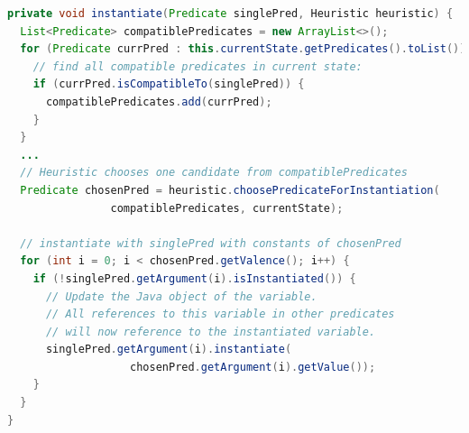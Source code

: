 \begin{lstlisting}[language=Java, 
	caption=Strips method  \textit{instantiate}, 
	keywordstyle=\color{blue},
	stringstyle=\color{red},
	commentstyle=\color{magenta},
	label = {code:instantiate}]
private void instantiate(Predicate singlePred, Heuristic heuristic) {
  List<Predicate> compatiblePredicates = new ArrayList<>();
  for (Predicate currPred : this.currentState.getPredicates().toList()) {
    // find all compatible predicates in current state:
    if (currPred.isCompatibleTo(singlePred)) {
      compatiblePredicates.add(currPred);
    }
  }
  ... 
  // Heuristic chooses one candidate from compatiblePredicates
  Predicate chosenPred = heuristic.choosePredicateForInstantiation(
				compatiblePredicates, currentState);
				
  // instantiate with singlePred with constants of chosenPred
  for (int i = 0; i < chosenPred.getValence(); i++) {
    if (!singlePred.getArgument(i).isInstantiated()) {
      // Update the Java object of the variable.
      // All references to this variable in other predicates
      // will now reference to the instantiated variable.
      singlePred.getArgument(i).instantiate(
                   chosenPred.getArgument(i).getValue());
    }
  } 
}
\end{lstlisting}

